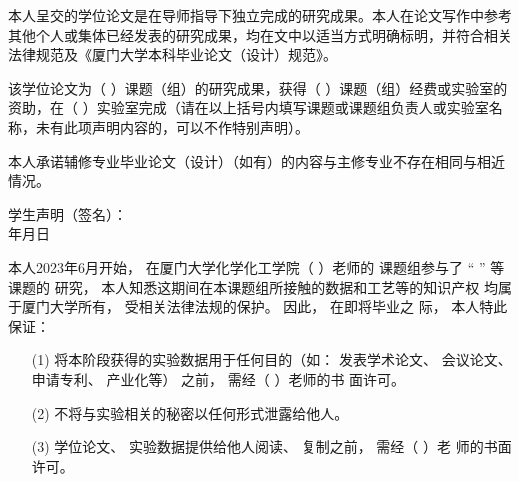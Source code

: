 \documentclass[14pt,a4paper]{xmuthesis}
\begin{document}
\begin{center}
\end{center}
\vspace{1cm}

本人呈交的学位论文是在导师指导下独立完成的研究成果。本人在论文写作中参考其他个人或集体已经发表的研究成果，均在文中以适当方式明确标明，并符合相关法律规范及《厦门大学本科毕业论文（设计）规范》。

该学位论文为（ ）课题（组）的研究成果，获得（ ）课题（组）经费或实验室的资助，在（ ）实验室完成（请在以上括号内填写课题或课题组负责人或实验室名称，未有此项声明内容的，可以不作特别声明）。

本人承诺辅修专业毕业论文（设计）（如有）的内容与主修专业不存在相同与相近情况。
\vspace{2cm}
\begin{flushleft}
    \hspace{16em}学生声明（签名）：\\
    \hspace{21em}年\hspace{2em}月\hspace{2em}日
\end{flushleft}
\thispagestyle{plain}
\addtocounter{pseudopage}{-1}
\blankpage
\begin{center}
\end{center}
\vspace{1cm}

本人2023年6月开始， 在厦门大学化学化工学院（ ）老师的
课题组参与了 “ ” 等课题的
研究， 本人知悉这期间在本课题组所接触的数据和工艺等的知识产权
均属于厦门大学所有， 受相关法律法规的保护。 因此， 在即将毕业之
际， 本人特此保证：
\begin{enumerate}
    \item [(1)]将本阶段获得的实验数据用于任何目的（如： 发表学术论文、
    会议论文、 申请专利、 产业化等） 之前， 需经（ ）老师的书
    面许可。
    \item [(2)]不将与实验相关的秘密以任何形式泄露给他人。
    \item [(3)]学位论文、 实验数据提供给他人阅读、 复制之前， 需经（ ）老
    师的书面许可。
\end{enumerate}
\end{document}
